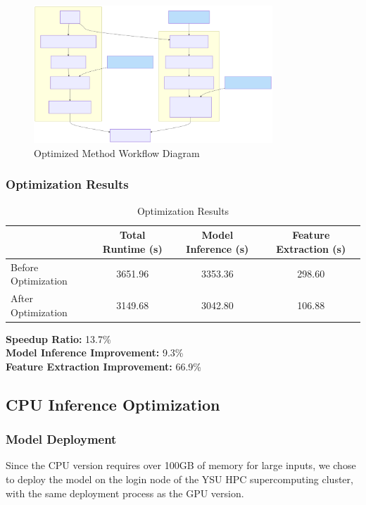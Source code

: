 \documentclass[a4paper,12pt]{article}
\begin{document}
\begin{figure}[htbp]
    \centering
    \includegraphics[width=0.8\textwidth, bb=0 0 800 600]{alphafold3-workflow.svg}
    \caption{Optimized Method Workflow Diagram}
    \label{fig:optim_flow_v2}
\end{figure}


\subsubsection{Optimization Results}

\begin{table}[H]
\centering
\caption{Optimization Results}
\vspace{0.5cm}
\begin{tabular}{lccc}
\toprule
 & Total Runtime (s) & Model Inference (s) & Feature Extraction (s) \\
\midrule
Before Optimization & 3651.96 & 3353.36 & 298.60 \\
After Optimization & 3149.68 & 3042.80 & 106.88 \\
\bottomrule
\end{tabular}
\end{table}

\textbf{Speedup Ratio:} 13.7\% \\
\textbf{Model Inference Improvement:} 9.3\% \\
\textbf{Feature Extraction Improvement:} 66.9\%

\subsection{CPU Inference Optimization}

\subsubsection{Model Deployment}
Since the CPU version requires over 100GB of memory for large inputs, we chose to deploy the model on the login node of the YSU HPC supercomputing cluster, with the same deployment process as the GPU version.
\end{document}
